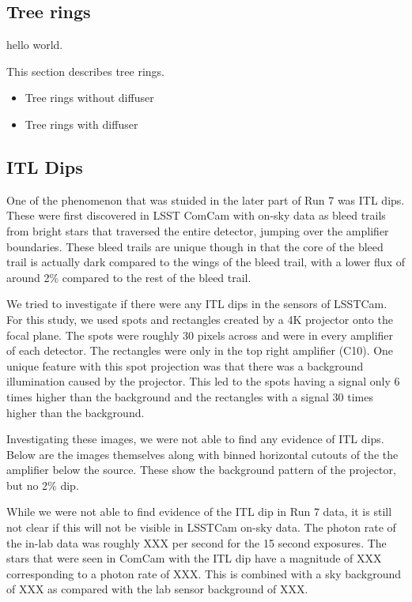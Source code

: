 \subsection{Tree rings}\label{tree-rings}

hello world.

This section describes tree rings.

\begin{itemize}
\tightlist
\item
  Tree rings without diffuser
\item
  Tree rings with diffuser
\end{itemize}

\subsection{ITL Dips}\label{itl-dips}

One of the phenomenon that was stuided in the later part of Run 7 was
ITL dips. These were first discovered in LSST ComCam with on-sky data as
bleed trails from bright stars that traversed the entire detector,
jumping over the amplifier boundaries. These bleed trails are unique
though in that the core of the bleed trail is actually
\textquotesingle dark\textquotesingle{} compared to the wings of the
bleed trail, with a lower flux of around 2\% compared to the rest of the
bleed trail.

We tried to investigate if there were any ITL dips in the sensors of
LSSTCam. For this study, we used spots and rectangles created by a 4K
projector onto the focal plane. The spots were roughly 30 pixels across
and were in every amplifier of each detector. The rectangles were only
in the top right amplifier (C10). One unique feature with this spot
projection was that there was a background illumination caused by the
projector. This led to the spots having a signal only 6 times higher
than the background and the rectangles with a signal 30 times higher
than the background.

Investigating these images, we were not able to find any evidence of ITL
dips. Below are the images themselves along with binned horizontal
cutouts of the the amplifier below the source. These show the background
pattern of the projector, but no 2\% dip.

While we were not able to find evidence of the ITL dip in Run 7 data, it
is still not clear if this will not be visible in LSSTCam on-sky data.
The photon rate of the in-lab data was roughly XXX per second for the 15
second exposures. The stars that were seen in ComCam with the ITL dip
have a magnitude of XXX corresponding to a photon rate of XXX. This is
combined with a sky background of XXX as compared with the lab sensor
background of XXX.

